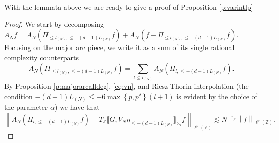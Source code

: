 \documentclass[12pt,leqno]{amsart}
\def\Z {{\mathbb Z}}
\newcounter{counter}
\newcounter{counter2}
\numberwithin{equation}{section}
\numberwithin{counter2}{section}
\theoremstyle{definition}
\theoremstyle{plain}
\begin{document}
	With the lemmata above we are ready to give a proof of Proposition \ref{p:varintlp} 
	\begin{proof}
		We start by decomposing $A_Nf=A_N(\Pi_{\leq l_{(N)},\leq -(d-1)L_{(N)}}f)+A_N(f-\Pi_{\leq l_{(N)},\leq -(d-1)L_{(N)}}f).$ Focusing on the major arc piece, we write it as a  sum of its single rational complexity counterparts   \begin{equation} \label{eq:singlecomplexitydecomp}
			A_N(\Pi_{\leq l_{(N)},\leq -(d-1)L_{(N)}}f)=\sum_{l \leq l_{(N)}}A_N(\Pi_{ l,\leq -(d-1)L_{(N)}}f).
		\end{equation} 
		By Proposition \ref{p:majorarcalldeg},	\eqref{eq:vn}, \cite[(6.11)]{KMSZ26} and Riesz-Thorin interpolation (the condition $-(d-1)L_{(N)} \leq -6\max \left\{p,p'\right\}(l+1)$ is evident by the choice of the parameter $\alpha$) we have that \begin{equation} \label{eq:majorarcerror} 
			\left \| A_{N} \left(\Pi_{ l,\leq -(d-1)L_{(N)}}f \right)-T_{\Z} \llbracket G, V_N \eta_{\leq-(d-1)L_{(N)}} \rrbracket_{\Sigma_l} f \right \|_{\ell^p(\Z)} \lesssim N^{-\tau_p} \left \| f \right \|_{\ell^p(\Z)}. 
		\end{equation}
		

\end{proof}
\end{document}
